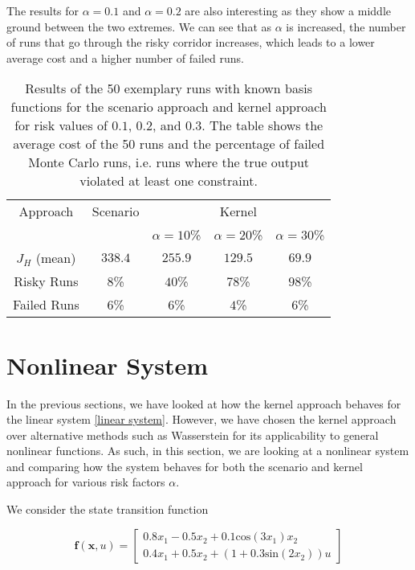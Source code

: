 The results for $\alpha = 0.1$ and $\alpha = 0.2$ are also interesting as they show a middle ground between the two extremes. We can see that as $\alpha$ is increased, the number of runs that go through the risky corridor increases, which leads to a lower average cost and a higher number of failed runs. 


\begin{table}
\centering
\begin{tabular}{|c| c| c| c| c|}
\hline
Approach & Scenario &  \multicolumn{3}{|c|}{Kernel}\\  \cline{3-5} & &  $\alpha = 10$\% & $\alpha = 20$\% & $\alpha = 30$\% \\
\hline
$J_H$ (mean) & $338.4$ & $255.9$ & $129.5$ & $69.9$\\
\hline
Risky Runs & $8$\% & $40$\% & $78$\% & $98$\% \\
\hline
Failed Runs & $6$\% & $6$\% & $4$\% & $6$\% \\
\hline
\end{tabular}
\caption{Results of the 50 exemplary runs with known basis functions for the scenario approach and kernel approach for risk values of $0.1$, $0.2$, and $0.3$. The table shows the average cost of the 50 runs and the percentage of failed Monte Carlo runs, i.e. runs where the true output violated at least one constraint.}
\label{tab:results_corridor}
\end{table} 


\section{Nonlinear System} \label{Nonlinear system}

In the previous sections, we have looked at how the kernel approach behaves for the linear system \eqref{linear system}. However, we have chosen the kernel approach over alternative methods such as Wasserstein for its applicability to general nonlinear functions. As such, in this section, we are looking at a nonlinear system and comparing how the system behaves for both the scenario and kernel approach for various risk factors $\alpha$.

We consider the state transition function

\begin{equation} \label{nonlinear system}
\boldsymbol{f}(\boldsymbol{x}, u) = 
\begin{bmatrix}
0.8  x_1 - 0.5 x_2 + 0.1 \text{cos} ( 3 x_1) x_2 \\
0.4 x_1 + 0.5 x_2 + (1 + 0.3 \text{sin} (2 x_2)) u
\end{bmatrix}
\end{equation}

